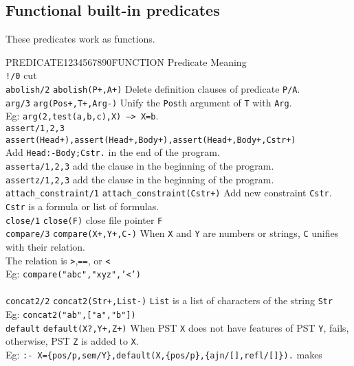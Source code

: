 \subsection{Functional built-in predicates}
These predicates work as functions. 
\begin{tabbing}
PREDICATE1234567890\= FUNCTION \kill
Predicate	\> Meaning \\
{\tt !/0} \> cut \\
{\tt abolish/2} \> {\tt abolish(P+,A+)}
	 Delete definition clauses of predicate {\tt P/A}.\\
{\tt arg/3} \> {\tt arg(Pos+,T+,Arg-)} Unify the {\tt Pos}th argument
of {\tt T} with {\tt Arg}.\\
	\> Eg: {\tt arg(2,test(a,b,c),X) --> X=b}.\\
{\tt assert/1,2,3} \> 
     {\tt assert(Head+),assert(Head+,Body+),assert(Head+,Body+,Cstr+)}\\
	\> Add {\tt Head:-Body;Cstr.} in the end of the program.\\
{\tt asserta/1,2,3} \> add the clause in the beginning of the program.\\
{\tt assertz/1,2,3} \> add the clause in the beginning of the
program.\\
{\tt attach\_constraint/1} \> {\tt attach\_constraint(Cstr+)} 
Add new constraint {\tt Cstr}.\\
	\> {\tt Cstr} is a formula or list of formulas.\\
{\tt close/1} \> {\tt close(F)} close file pointer {\tt F}\\
{\tt compare/3} \> {\tt compare(X+,Y+,C-)} When {\tt X} and {\tt Y}
are numbers or strings, {\tt C} unifies with their relation.\\
	\> The relation is \verb->-,\verb-==-, or \verb-<-\\
	\> Eg: {\tt compare("abc","xyz",'<')}\\
	\> \hspace{19pt}{\tt compare(123,456,'<')}\\
{\tt concat2/2} \> {\tt concat2(Str+,List-)} {\tt List} is a list of
characters of the string {\tt Str}\\
	\> Eg: {\tt concat2("ab",["a","b"])}\\
{\tt default} \> {\tt default(X?,Y+,Z+)} When PST {\tt X} does not
	have features of PST {\tt Y}, fails,\\
	\>otherwise, PST {\tt Z} is added to {\tt X}.\\
	\>Eg: {\tt :- X=\{pos/p,sem/Y\},default(X,\{pos/p\},\{ajn/[],refl/[]\}).} makes\\ 

\end{tabbing}
